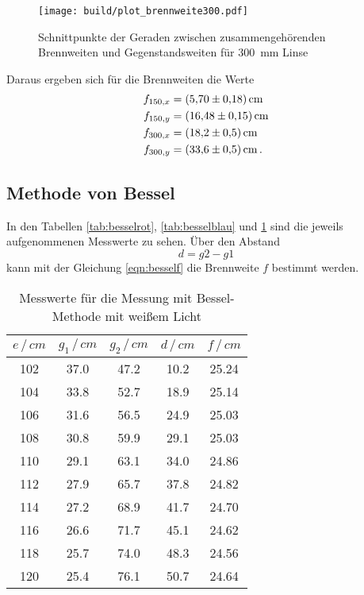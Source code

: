 \begin{figure}
    \centering
    \texttt{[image: build/plot\_brennweite300.pdf]}
    \caption{Schnittpunkte der Geraden zwischen zusammengehörenden Brennweiten und Gegenstandsweiten für \SI{300}{\mm} Linse }
    \label{fig:300}
\end{figure}

Daraus ergeben sich für die Brennweiten die Werte 
\begin{align*}
    f_{150,x} &= \SI{5.70+-0.18}{\centi\metre} \\
    f_{150,y} &= \SI{16.48+-0.15}{\centi\metre} \\
    f_{300,x} &= \SI{18.2+-0.5}{\centi\metre} \\
    f_{300,y} &= \SI{33.6+-0.5}{\centi\metre} \, .
\end{align*}

\subsection{Methode von Bessel}

In den Tabellen \ref{tab:besselrot}, \ref{tab:besselblau} und \ref{tab:bessel1} sind die jeweils aufgenommenen Messwerte 
zu sehen. Über den Abstand 
\begin{equation}
    d = g2-g1
\end{equation} kann mit der Gleichung \ref{eqn:besself} die Brennweite $f$ bestimmt werden. 

\begin{table}
    \centering
    \caption{Messwerte für die Messung mit Bessel-Methode mit weißem Licht}
    \begin{tabular}{c c c c c}
        \toprule
        $ e\,/\,cm$ & $g_1\,/\,cm$ & $g_2\,/\,cm$ & $d\,/\,cm$ & $f\,/\,cm$ \\
        \midrule
        102 & 37.0 & 47.2 & 10.2 & 25.24 \\
        104 & 33.8 & 52.7 & 18.9 & 25.14 \\
        106 & 31.6 & 56.5 & 24.9 & 25.03 \\
        108 & 30.8 & 59.9 & 29.1 & 25.03 \\
        110 & 29.1 & 63.1 & 34.0 & 24.86 \\
        112 & 27.9 & 65.7 & 37.8 & 24.82 \\
        114 & 27.2 & 68.9 & 41.7 & 24.70 \\
        116 & 26.6 & 71.7 & 45.1 & 24.62 \\
        118 & 25.7 & 74.0 & 48.3 & 24.56 \\
        120 & 25.4 & 76.1 & 50.7 & 24.64 \\
        \bottomrule
    \end{tabular}
    \label{tab:bessel1}
\end{table}


